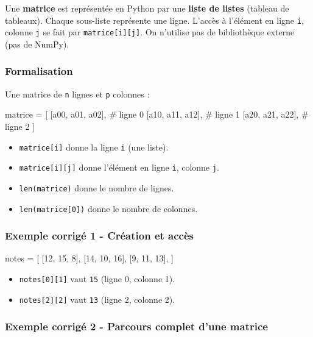 Une \textbf{matrice} est représentée en Python par une \textbf{liste de
listes} (tableau de tableaux). Chaque sous-liste représente une ligne.
L'accès à l'élément en ligne \texttt{i}, colonne \texttt{j} se fait par
\texttt{matrice{[}i{]}{[}j{]}}. On n'utilise pas de bibliothèque externe
(pas de NumPy).

\subsubsection{Formalisation}

Une matrice de \texttt{n} lignes et \texttt{p} colonnes :

\begin{python}
matrice = [
    [a00, a01, a02],  # ligne 0
    [a10, a11, a12],  # ligne 1
    [a20, a21, a22],  # ligne 2
]
\end{python}

\begin{itemize}
\tightlist
\item
  \texttt{matrice{[}i{]}} donne la ligne \texttt{i} (une liste).
\item
  \texttt{matrice{[}i{]}{[}j{]}} donne l'élément en ligne \texttt{i},
  colonne \texttt{j}.
\item
  \texttt{len(matrice)} donne le nombre de lignes.
\item
  \texttt{len(matrice{[}0{]})} donne le nombre de colonnes.
\end{itemize}

\subsubsection{Exemple corrigé 1 - Création et accès}

\begin{python}
notes = [
    [12, 15, 8],
    [14, 10, 16],
    [9, 11, 13],
]
\end{python}

\begin{itemize}
\tightlist
\item
  \texttt{notes{[}0{]}{[}1{]}} vaut \texttt{15} (ligne 0, colonne 1).
\item
  \texttt{notes{[}2{]}{[}2{]}} vaut \texttt{13} (ligne 2, colonne 2).
\end{itemize}

\subsubsection{Exemple corrigé 2 - Parcours complet d’une matrice}

